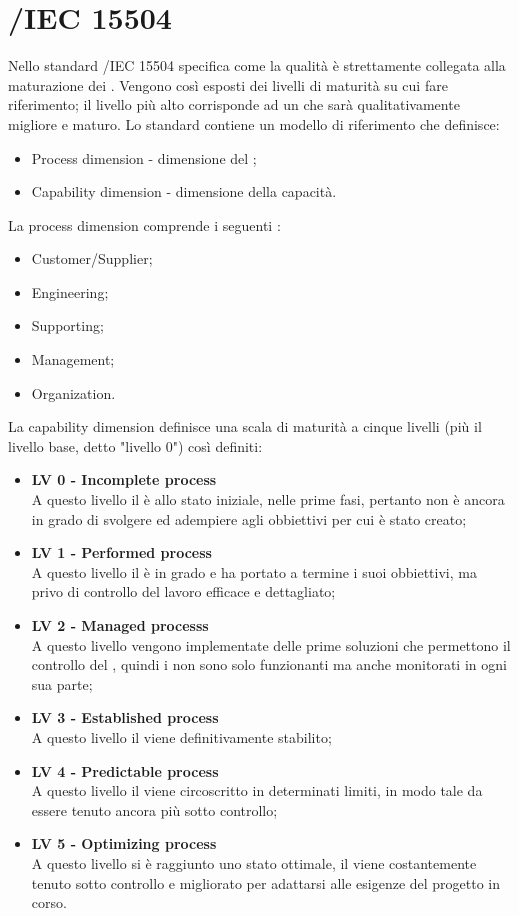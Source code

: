 \section{/IEC 15504 }
\label{sec:iso}
Nello standard /IEC 15504 specifica come la qualità è strettamente collegata alla maturazione dei . Vengono così esposti dei livelli di maturità su cui fare riferimento; il livello più alto corrisponde ad un  che sarà qualitativamente migliore e maturo.
Lo standard contiene un modello di riferimento che definisce:
\begin{itemize}
	\item Process dimension - dimensione del ;
	\item Capability dimension - dimensione della capacità.
\end{itemize}
La process dimension comprende i seguenti :
\begin{itemize}
	\item Customer/Supplier;
	\item Engineering;
	\item Supporting;
	\item Management;
	\item Organization.
\end{itemize}
La capability dimension definisce una scala di maturità a cinque livelli (più il livello base, detto "livello 0") così definiti:
\begin{itemize}
	\item \textbf{LV 0 - Incomplete process}\\ A questo livello il  è allo stato iniziale, nelle prime fasi, pertanto non è ancora in grado di svolgere ed adempiere agli obbiettivi per cui è stato creato;
	\item \textbf{LV 1 - Performed process}\\ A questo livello il  è in grado e ha portato a termine i suoi obbiettivi, ma privo di controllo del lavoro efficace e dettagliato;
	\item \textbf{LV 2 - Managed processs}\\ A questo livello vengono implementate delle prime soluzioni che permettono il controllo del , quindi i  non sono solo funzionanti ma anche monitorati in ogni sua parte;
	\item \textbf{LV 3 - Established process}\\ A questo livello il  viene definitivamente stabilito;
	\item \textbf{LV 4 - Predictable process}\\ A questo livello il  viene circoscritto in determinati limiti, in modo tale da essere tenuto ancora più sotto controllo;
	\item \textbf{LV 5 - Optimizing process}\\ A questo livello si è raggiunto uno stato ottimale, il  viene costantemente tenuto sotto controllo e migliorato per adattarsi alle esigenze del progetto in corso.
\end{itemize}
